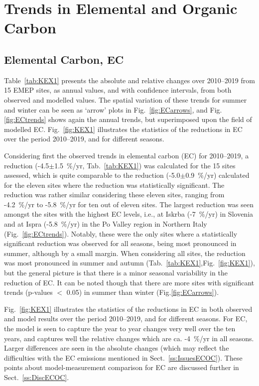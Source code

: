\clearpage
\section{Trends in Elemental and Organic Carbon}
\label{sec:trendsECOC}
\subsection{Elemental Carbon, EC}
\label{ss:trendsEC}

Table~\ref{tab:KEX1} presents the absolute and relative changes over 2010--2019 from 15 EMEP sites, as annual values, and with confidence intervals, from both observed and modelled values. The spatial variation of these trends for summer and winter can be seen as `arrow' plots in Fig.~\ref{fig:ECarrows}, and Fig.\ref{fig:ECtrends} shows again the annual trends, but superimposed upon the field of modelled EC.
Fig.~\ref{fig:KEX1} illustrates the statistics of the reductions in EC over the period 2010--2019, and for different seasons. 

%
Considering first the observed trends in elemental carbon (EC) for 2010--2019, a  reduction (-4.5$\pm$1.5~\%/yr, Tab.~\ref{tab:KEX1}) 
 was
calculated for the 15 sites assessed, which is
quite comparable to the reduction (-5.0$\pm$0.9~\%/yr)
calculated for the eleven sites where the reduction was statistically
significant. The reduction was rather similar considering these eleven
sites, ranging from -4.2~\%/yr to -5.8~\%/yr for ten out of eleven
sites. %
The largest reduction was seen amongst the sites with the
highest EC levels, i.e., at Iskrba (-7~\%/yr) in Slovenia and at Ispra
(-5.8~\%/yr) in the Po Valley region in Northern Italy (Fig.~\ref{fig:ECtrends}). Notably, these
were the only sites where a statistically significant reduction was
observed for all seasons, being most pronounced in summer, although
by a small margin. When considering all sites, the reduction was most
pronounced in summer and autumn (Tab.~\ref{tab:KEX1},Fig.~\ref{fig:KEX1}), but the general picture is
that there is a minor seasonal variability in the reduction of EC. It can be noted though that
there are more sites with significant trends (p-values $<$ 0.05)  in summer than winter (Fig.\ref{fig:ECarrows}).


Fig.~\ref{fig:KEX1} illustrates the statistics of the reductions in EC in both observed and model results over the period 2010--2019, and for different seasons. For EC, the model is seen to capture the year to year changes very well over the ten years, and captures well the relative changes which are ca. -4~\%/yr in all seasons. Larger differences are seen in the absolute changes (which may reflect the difficulties with the EC emissions mentioned in Sect.~\ref{ss:IssuesECOC}).
These points about model-measurement comparison for EC are discussed further in Sect.~\ref{ss:DiscECOC}.

